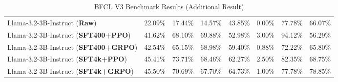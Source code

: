 \begin{table}[!t]
{\begin{tabular}{lccccccc}
\midrule
Llama-3.2-3B-Instruct (\textbf{Raw}) & 22.09\% & 17.44\% & 14.57\% & 43.85\% & 0.00\% & 77.78\% & 66.07\% \\
Llama-3.2-3B-Instruct (\textbf{SFT400+PPO}) & 41.62\% & 68.10\% & 69.88\% & 52.98\% & 3.00\% & 94.12\% & 56.29\% \\
Llama-3.2-3B-Instruct (\textbf{SFT400+GRPO}) & 42.54\% & 65.15\% & 68.98\% & 59.40\% & 0.88\% & 72.22\% & 65.80\% \\
Llama-3.2-3B-Instruct (\textbf{SFT4k+PPO}) & 45.41\% & 73.71\% & 68.46\% & 62.27\% & 2.50\% & 82.35\% & 68.75\% \\
Llama-3.2-3B-Instruct (\textbf{SFT4k+GRPO}) & 45.50\% & 70.69\% & 67.70\% & 64.73\% & 1.00\% & 77.78\% & 78.85\% \\
\bottomrule
\end{tabular}
}
\caption{BFCL V3 Benchmark Results (Additional Result)}
\label{tab:bfcl-result-additional}
\end{table}



